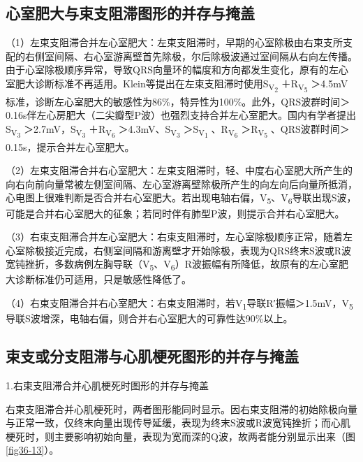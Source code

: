 \protect\hypertarget{text00043.htmlux5cux23subid477}{}{}

\subsection{心室肥大与束支阻滞图形的并存与掩盖}

（1）左束支阻滞合并左心室肥大：左束支阻滞时，早期的心室除极由右束支所支配的右侧室间隔、右心室游离壁首先除极，尔后除极波通过室间隔从右向左传播。由于心室除极顺序异常，导致QRS向量环的幅度和方向都发生变化，原有的左心室肥大诊断标准不再适用。Klein等提出在左束支阻滞时使用S\textsubscript{V\textsubscript{2}}
＋R\textsubscript{V\textsubscript{5}}
＞4.5mV标准，诊断左心室肥大的敏感性为86\%，特异性为100\%。此外，QRS波群时间＞0.16s伴左心房肥大（二尖瓣型P波）也强烈支持合并左心室肥大。国内有学者提出S\textsubscript{V\textsubscript{3}}
＞2.7mV，S\textsubscript{V\textsubscript{3}}
＋R\textsubscript{V\textsubscript{6}}
＞4.3mV、S\textsubscript{V\textsubscript{3}}
＞S\textsubscript{V\textsubscript{1}}
、R\textsubscript{V\textsubscript{6}}
＞R\textsubscript{V\textsubscript{5}}
、QRS波群时间＞0.15s，提示合并左心室肥大。

（2）左束支阻滞合并右心室肥大：左束支阻滞时，轻、中度右心室肥大所产生的向右向前向量常被左侧室间隔、左心室游离壁除极所产生的向左向后向量所抵消，心电图上很难判断是否合并右心室肥大。若出现电轴右偏，V\textsubscript{5}、V\textsubscript{6}导联出现S波，可能是合并右心室肥大的征象；若同时伴有肺型P波，则提示合并右心室肥大。

（3）右束支阻滞合并左心室肥大：右束支阻滞时，左心室除极顺序正常，随着左心室除极接近完成，右侧室间隔和游离壁才开始除极，表现为QRS终末S波或R波宽钝挫折，多数病例左胸导联（V\textsubscript{5}、V\textsubscript{6}）R波振幅有所降低，故原有的左心室肥大诊断标准仍可适用，只是敏感性降低了。

（4）右束支阻滞合并右心室肥大：右束支阻滞时，若V\textsubscript{1}导联R′振幅＞1.5mV，V\textsubscript{5}导联S波增深，电轴右偏，则合并右心室肥大的可靠性达90\%以上。

\protect\hypertarget{text00043.htmlux5cux23subid478}{}{}

\subsection{束支或分支阻滞与心肌梗死图形的并存与掩盖}

1.右束支阻滞合并心肌梗死时图形的并存与掩盖

右束支阻滞合并心肌梗死时，两者图形能同时显示。因右束支阻滞的初始除极向量与正常一致，仅终末向量出现传导延缓，表现为终末S波或R波宽钝挫折；而心肌梗死时，则主要影响初始向量，表现为宽而深的Q波，故两者能分别显示出来（图\ref{fig36-13}）。

